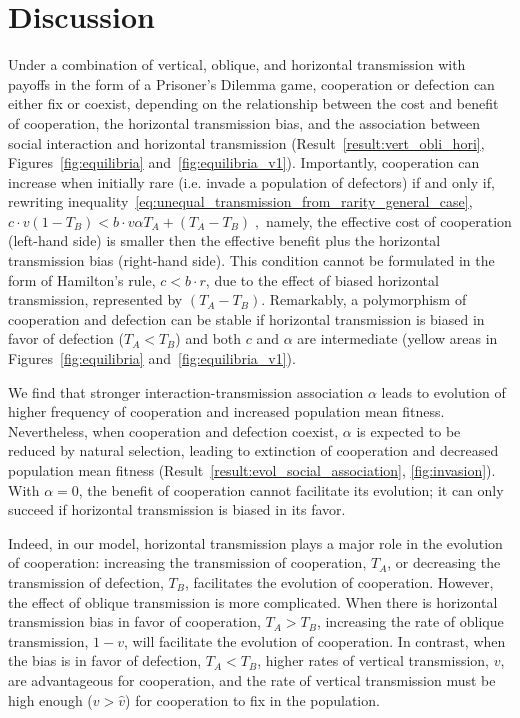 \documentclass[12pt]{extarticle}
\begin{document}
\section{Discussion}
Under a combination of vertical, oblique, and horizontal transmission with payoffs in the form of a Prisoner's Dilemma game, cooperation or defection can either fix or coexist, depending on the relationship between the cost and benefit of cooperation, the horizontal transmission bias, and the association between social interaction and horizontal transmission (Result~\ref{result:vert_obli_hori}, Figures~\ref{fig:equilibria} and~\ref{fig:equilibria_v1}).
Importantly, cooperation can increase when initially rare (i.e. invade a population of defectors) if and only if, rewriting inequality~\ref{eq:unequal_transmission_from_rarity_general_case},
$
c \cdot v (1-T_B) < b \cdot v \alpha T_A + (T_A - T_B) \;,
$
namely, the effective cost of cooperation (left-hand side) is smaller then the effective benefit plus the horizontal transmission bias (right-hand side).
This condition cannot be formulated in the form of Hamilton's rule, $c<b \cdot r$, due to the effect of biased horizontal transmission, represented by $(T_A-T_B)$.
Remarkably, a polymorphism of cooperation and defection can be stable if horizontal transmission is biased in favor of defection ($T_A<T_B$) and both $c$ and $\alpha$ are intermediate (yellow areas in Figures~\ref{fig:equilibria} and~\ref{fig:equilibria_v1}).

We find that stronger interaction-transmission association $\alpha$ leads to evolution of higher frequency of cooperation and increased population mean fitness.
Nevertheless, when cooperation and defection coexist, $\alpha$ is expected to be reduced by natural selection, leading to extinction of cooperation and decreased population mean fitness (Result~\ref{result:evol_social_association}, \autoref{fig:invasion}).
With $\alpha=0$, the benefit of cooperation cannot facilitate its evolution; it can only succeed if horizontal transmission is biased in its favor. 

Indeed, in our model, horizontal transmission plays a major role in the evolution of cooperation: increasing the transmission of cooperation, $T_A$, or decreasing the transmission of defection, $T_B$, facilitates the evolution of cooperation. 
However, the effect of oblique transmission is more complicated.
When there is horizontal transmission bias in favor of cooperation, $T_A>T_B$, increasing the rate of oblique transmission, $1-v$, will facilitate the evolution of cooperation.
In contrast, when the bias is in favor of defection, $T_A<T_B$, higher rates of vertical transmission, $v$, are advantageous for cooperation, and the rate of vertical transmission must be high enough ($v>\hat v$) for cooperation to fix in the population.
\end{document}
